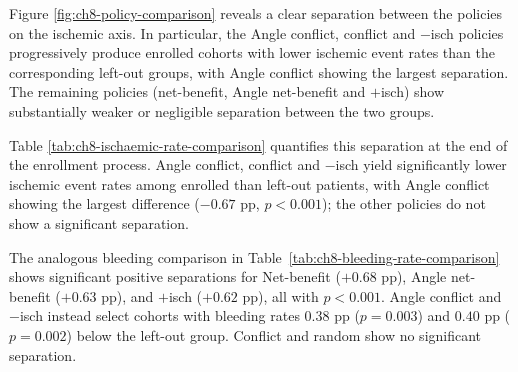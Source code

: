 Figure \ref{fig:ch8-policy-comparison} reveals a clear separation between the policies
on the ischemic axis. In particular, the Angle conflict, conflict and $-$isch policies
progressively produce enrolled cohorts with lower ischemic event rates than the
corresponding left-out groups, with Angle conflict showing the largest separation.
The remaining policies (net-benefit, Angle net-benefit and $+$isch) show substantially
weaker or negligible separation between the two groups.

\begin{table}[H]
    \centering
    \small
    \setlength{\tabcolsep}{5pt}
    
    \caption{Comparison of ischemic event rates at $n=3500$. Rates are averaged
    over 100 runs and compare the 2,500 actively selected patients, after excluding
    the random 1,000-patient seed, with the 1,079 patients left out. Diff.\ is the
    selected-minus-left-out difference; SEM is the standard error of the paired
    per-run differences; $p$ is from a paired two-sided Wilcoxon signed-rank test.}
    \label{tab:ch8-ischaemic-rate-comparison}
\end{table}

Table \ref{tab:ch8-ischaemic-rate-comparison} quantifies this separation at the end
of the enrollment process. Angle conflict, conflict and $-$isch yield significantly
lower ischemic event rates among enrolled than left-out patients, with Angle
conflict showing the largest difference ($-0.67$ pp, $p<0.001$); the other policies
do not show a significant separation.

\begin{table}[H]
    \centering
    \small
    \setlength{\tabcolsep}{4pt}
    
    \caption{Comparison of bleeding event rates at $n=3500$. Rates are averaged
    over 100 runs and compare the 2,500 actively selected patients, after excluding
    the random 1,000-patient seed, with the 1,079 patients left out. Diff.\ is the
    selected-minus-left-out difference; SEM is the standard error of the paired
    per-run differences; $p$ is from a paired two-sided Wilcoxon signed-rank test.}
    \label{tab:ch8-bleeding-rate-comparison}
\end{table}

The analogous bleeding comparison in Table~\ref{tab:ch8-bleeding-rate-comparison}
shows significant positive separations for Net-benefit ($+0.68$ pp), Angle net-benefit
($+0.63$ pp), and $+$isch ($+0.62$ pp), all with $p<0.001$. Angle conflict and $-$isch
instead select cohorts with bleeding rates $0.38$ pp ($p=0.003$) and $0.40$ pp
($p=0.002$) below the left-out group. Conflict and random show no significant separation.

